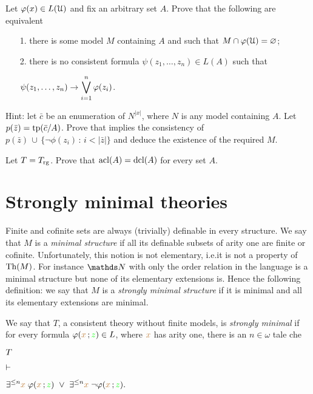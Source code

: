 \begin{exercise}\label{ex_almost_satisfied}
Let $\varphi(x)\in L(\EuScript U)$ and fix an arbitrary set $A$.
Prove that the following are equivalent
\begin{itemize}
\item[1.] there is some model $M$ containing $A$ and such that $M\cap\varphi(\EuScript U)=\varnothing$;
\item[2.] there is no consistent formula $\psi(z_1,\dots,z_n)\in L(A)$ such that

\hfil$\displaystyle\psi(z_1,\dots,z_n)\rightarrow\bigvee^n_{i=1}\varphi(z_i)$.
\end{itemize}
Hint: let $\bar c$ be an enumeration of $N^{|x|}$, where $N$ is any model containing $A$.
Let $p(\bar z)={\rm tp}(\bar c/A)$.
Prove that  implies the consistency of $p(\bar z)\,\cup\, \big\{\neg\phi(z_i)\, :\, i<|\bar z|\big\}$ and deduce the existence of the required $M$.\QED
\end{exercise}

\begin{exercise}
  Let $T=T_{\rm rg}$. Prove that $\mathop{\rm acl}(A)=\mathop{\rm dcl}(A)$ for every set $A$.
\end{exercise} 
\section{Strongly minimal theories\label{tfm}}%
 
\def\medrel#1{\parbox[t]{5ex}{$\displaystyle\hfil #1$}}
\def\ceq#1#2#3{\parbox{15ex}{$\displaystyle #1$}\medrel{#2}$\displaystyle  #3$}

Finite and cofinite sets are always (trivially) definable in every structure.
We say that $M$ is a \emph{minimal structure\/} if all its definable subsets of arity one are finite or cofinite.
Unfortunately, this notion is not elementary, i.e.\@ it is not a property of ${\rm Th}(M)$.
For instance $\NN$ with only the order relation in the language is a minimal structure but 
none of its elementary extensions is.
Hence the following definition: 
we say that $M$ is a \emph{strongly minimal structure\/} if it is minimal and all its elementary extensions are minimal.

We say that $T$, a consistent theory without finite models, is \emph{strongly minimal\/} if 
for every formula $\varphi({\color{brown} x}\,;{\color{green} z})\in L$, where ${\color{brown} x}$ has arity one, there is an  $n\in\omega$ tale che

\ceq{\hfill T}
{\proves}
{\E^{\le n}{\mr x}\;\phi({\mr x}\,;{\gr z})\ \vee\ \E^{\le n}{\mr x}\;\neg\phi({\mr x}\,;{\gr z}).}

